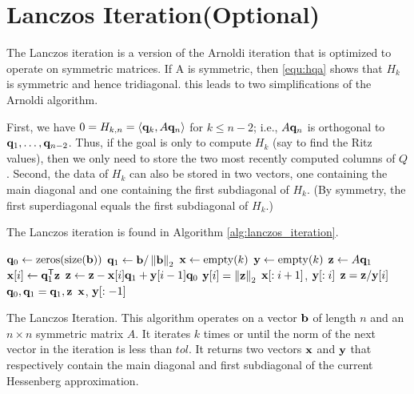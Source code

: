 \section*{Lanczos Iteration(Optional)}
The Lanczos iteration is a version of the Arnoldi iteration that is optimized to operate on symmetric matrices.
If A is symmetric, then \eqref{equ:hqa} shows that $H_k$ is symmetric and hence tridiagonal.
this leads to two simplifications of the Arnoldi algorithm.

First, we have $0=H_{k, n}=\langle {\bf q}_k, A{\bf q}_n \rangle$ for $k \leq n-2$; i.e., $A{\bf q}_n$ is orthogonal to ${\bf q}_1, \ldots, {\bf q}_{n-2}$. 
Thus, if the goal is only to compute $H_k$ (say to find the Ritz values), then we only need to store the two most recently computed columns of $Q$.
Second, the data of $H_k$ can also be stored in two vectors, one containing the main diagonal and one containing the first subdiagonal of $H_k$. 
(By symmetry, the first superdiagonal equals the first subdiagonal of $H_k$.)

The Lanczos iteration is found in Algorithm \ref{alg:lanczos_iteration}.

\begin{algorithm}
\begin{algorithmic}[1]
	\State $\q_0 \gets \zeros{\size{\b}}$								
	\State ${\bf q}_1 \gets {\bf b}/\left\lVert{\bf b}\right\rVert_2$
	\State $\x \gets \allocate{k}$
	\State $\y \gets \allocate{k}$
										
		\State ${\bf z} \gets A{\bf q}_1$					
		\State ${\bf x}[i] \gets {\bf q}_1^{\mathsf T} {\bf z}$				
		\State ${\bf z} \gets {\bf z} - {\bf x}[i] {\bf q}_1 + {\bf y}[i-1] {\bf q}_0$				
		\State ${\bf y}[i] = \left\lVert{\bf z}\right\rVert_2$						
										
			\State {} ${\bf x}[: i+1]$, ${\bf y}[: i]$
		\EndIf
		\State ${\bf z} = {\bf z}/ {\bf y}[i]$
		\State ${\bf q}_0, {\bf q}_1 = {\bf q}_1, {\bf z}$						
	\EndFor
	\State {} ${\bf x}$, ${\bf y}[: -1]$
\EndProcedure
\end{algorithmic}
\caption{The Lanczos Iteration. This algorithm operates on a vector ${\bf b}$ of length $n$ and an $n \times n$ symmetric matrix $A$. It iterates $k$ times or until the norm of the next vector in the iteration is less than $tol$. It returns two vectors ${\bf x}$ and ${\bf y}$ that respectively contain the main diagonal and first subdiagonal of the current Hessenberg approximation.}
\label{alg:lanczos_iteration}
\end{algorithm}

